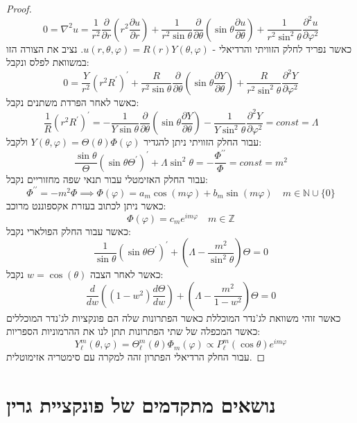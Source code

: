 \documentclass{tstextbook}
\begin{document}
\begin{proof}
$$0=\nabla^{2}u={\frac{1}{r^{2}}}{\frac{\partial}{\partial r}}\left(r^{2}{\frac{\partial u}{\partial r}}\right)+{\frac{1}{r^{2}\sin\theta}}{\frac{\partial}{\partial\theta}}\left(\sin\theta{\frac{\partial u}{\partial\theta}}\right)+{\frac{1}{r^{2}\sin^{2}\theta}}{\frac{\partial^{2}u}{\partial\varphi^{2}}}$$
כאשר נפריד לחלק הזוויתי והרדיאלי - \(u\left( r,\theta,\varphi \right)=R(r)Y\left( \theta,\varphi \right)\). נציב את הצורה הזו במשוואת לפלס ונקבל:
$$0=\frac{Y}{r^{2}}\left(r^{2}R^{\prime}\right)^{\prime}+\frac{R}{r^{2}\sin\theta}\frac{\partial}{\partial\theta}\left(\sin\theta\frac{\partial Y}{\partial\theta}\right)+\frac{R}{r^{2}\sin^{2}\theta}\frac{\partial^{2}Y}{\partial\varphi^{2}}$$
כאשר לאחר הפרדת משתנים נקבל:
$${\frac{1}{R}}\left(r^{2}R^{\prime}\right)^{\prime}=-{\frac{1}{Y\sin\theta}}{\frac{\partial}{\partial\theta}}\left(\sin\theta{\frac{\partial Y}{\partial\theta}}\right)-{\frac{1}{Y\sin^{2}\theta}}{\frac{\partial^{2}Y}{\partial\varphi^{2}}}=c o n s t=\Lambda$$
עבור החלק הזוויתי ניתן להגדיר \(Y\left( \theta,\varphi \right)=\Theta\left( \theta \right)\Phi\left( \varphi \right)\) ולקבל:
$$\frac{\sin\theta}{\Theta}\left(\sin\theta\Theta^{\prime}\right)^{\prime}+\Lambda\sin^{2}\theta=-\frac{\Phi^{\prime\prime}}{\Phi}=c o n s t=m^{2}$$
עבור החלק האזימטלי עבור תנאי שפה מחזוריים נקבל:
$$\Phi^{\prime\prime}=-m^{2}\Phi\implies \Phi\left( \varphi \right)=a_{m}\cos\left( m\varphi \right)+b_{m}\sin\left( m\varphi \right) \quad  m \in \mathbb{N}\cup \{ 0 \}$$
כאשר ניתן לכתוב בעזרת אקספוננט מרוכב:
$$\Phi\left( \varphi \right)=c_{m}e^{i m\varphi}\quad m \in \mathbb{Z}$$
כאשר עבור החלק הפולארי נקבל:
$$\frac{1}{\sin\theta}\left(\sin\theta\Theta^{\prime}\right)^{\prime}+\left(\Lambda-\frac{m^{2}}{\sin^{2}\theta}\right)\Theta=0$$
כאשר לאחר הצבה \(w=\cos\left( \theta \right)\) נקבל:
$$\frac{d}{d w}\left((1-w^{2})\frac{d\Theta}{d w}\right)+\left(\Lambda-\frac{m^{2}}{1-w^{2}}\right)\Theta=0$$
כאשר זוהי משוואת לג'נדר המוכללת כאשר הפתרונות שלה הם פונקציות לג'נדר המוכללים כאשר המכפלה של שתי הפתרונות תתן לנו את ההרמוניות הספריות:
$$Y_{\ell}^{m}(\theta,\varphi)=\Theta_{\ell}^{m}(\theta)\Phi_{m}(\varphi)\propto P_{\ell}^{m}(\cos\theta)e^{i m\varphi}$$
עבור החלק הרדיאלי הפתרון זהה למקרה עם סימטריה אזימוטלית.

\end{proof}
\section{נושאים מתקדמים של פונקציית גרין}
\end{document}
